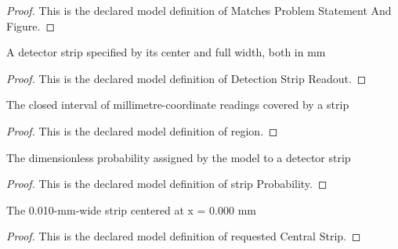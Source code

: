 \begin{proof}
  This is the declared model definition of Matches Problem Statement And Figure.
\end{proof}
\begin{definition}
  \label{def:physics:phyx-mini-0502:phyxminiproblems-problemphyxmini0502-detectionstripreadout}
  A detector strip specified by its center and full width, both in mm
\end{definition}
\begin{proof}
  This is the declared model definition of Detection Strip Readout.
\end{proof}
\begin{definition}[region]
  \label{def:physics:phyx-mini-0502:phyxminiproblems-problemphyxmini0502-detectionstripreadout-region}
  The closed interval of millimetre-coordinate readings covered by a strip
\end{definition}
\begin{proof}
  This is the declared model definition of region.
\end{proof}
\begin{definition}
  \label{def:physics:phyx-mini-0502:phyxminiproblems-problemphyxmini0502-stripprobability}
  The dimensionless probability assigned by the model to a detector strip
\end{definition}
\begin{proof}
  This is the declared model definition of strip Probability.
\end{proof}
\begin{definition}
  \label{def:physics:phyx-mini-0502:phyxminiproblems-problemphyxmini0502-requestedcentralstrip}
  The 0.010-mm-wide strip centered at x = 0.000 mm
\end{definition}
\begin{proof}
  This is the declared model definition of requested Central Strip.
\end{proof}
